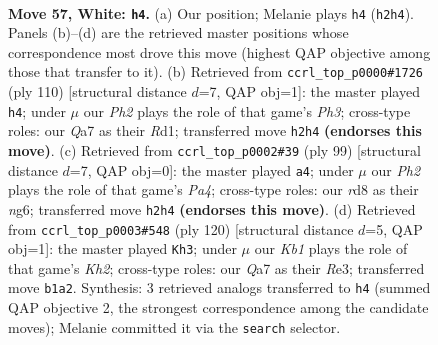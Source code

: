 \documentclass[11pt]{article}
\begin{document}
\clearpage

\begin{figure}[p]\centering
\begin{subfigure}{0.46\textwidth}\centering
\resizebox{\linewidth}{!}{%
\newchessgame
\chessboard[
  setfen={3r4/Q7/4k3/6P1/4P3/8/7P/1K6 w - - 1 57},
  showmover=false,
  pgfstyle=straightmove, color=movearrow, markmove={h2-h4}
]}
\caption{}
\end{subfigure}\hfill
\begin{subfigure}{0.46\textwidth}\centering
\resizebox{\linewidth}{!}{%
\newchessgame
\chessboard[
  setfen={6r1/8/8/4k2K/8/5P1P/8/3R4 w - - 3 56},
  showmover=false,
  pgfstyle=straightmove, color=movearrow, markmove={h3-h4}
]}
\caption{}
\end{subfigure}
\\[4pt]
\begin{subfigure}{0.46\textwidth}\centering
\resizebox{\linewidth}{!}{%
\newchessgame
\chessboard[
  setfen={8/3k4/5pN1/pp6/3K4/8/8/8 b - - 1 50},
  showmover=false,
  pgfstyle=straightmove, color=movearrow, markmove={a5-a4}
]}
\caption{}
\end{subfigure}\hfill
\begin{subfigure}{0.46\textwidth}\centering
\resizebox{\linewidth}{!}{%
\newchessgame
\chessboard[
  setfen={8/3r4/5k2/8/5P1P/4R3/7K/8 w - - 1 61},
  showmover=false,
  pgfstyle=straightmove, color=movearrow, markmove={h2-h3}
]}
\caption{}
\end{subfigure}
\caption{\textbf{Move 57, White: \texttt{h4}.} (a) Our position; Melanie plays \texttt{h4} (\texttt{h2h4}). Panels (b)--(d) are the retrieved master positions whose correspondence most drove this move (highest QAP objective among those that transfer to it). (b) Retrieved from \texttt{ccrl\_top\_p0000\#1726} (ply 110) [structural distance $d$=7, QAP obj=1]: the master played \texttt{h4}; under $\mu$ our \emph{Ph2} plays the role of that game's \emph{Ph3}; cross-type roles: our \emph{Q}a7 as their \emph{R}d1; transferred move \texttt{h2h4} \textbf{(endorses this move)}. (c) Retrieved from \texttt{ccrl\_top\_p0002\#39} (ply 99) [structural distance $d$=7, QAP obj=0]: the master played \texttt{a4}; under $\mu$ our \emph{Ph2} plays the role of that game's \emph{Pa4}; cross-type roles: our \emph{r}d8 as their \emph{n}g6; transferred move \texttt{h2h4} \textbf{(endorses this move)}. (d) Retrieved from \texttt{ccrl\_top\_p0003\#548} (ply 120) [structural distance $d$=5, QAP obj=1]: the master played \texttt{Kh3}; under $\mu$ our \emph{Kb1} plays the role of that game's \emph{Kh2}; cross-type roles: our \emph{Q}a7 as their \emph{R}e3; transferred move \texttt{b1a2}. Synthesis: 3 retrieved analogs transferred to \texttt{h4} (summed QAP objective 2, the strongest correspondence among the candidate moves); Melanie committed it via the \texttt{search} selector.}
\label{fig:thought-m112}
\end{figure}
\end{document}
